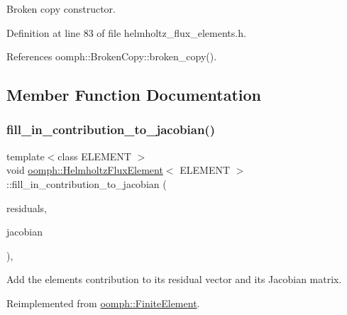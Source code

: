 Broken copy constructor. 



Definition at line 83 of file helmholtz\+\_\+flux\+\_\+elements.\+h.



References oomph\+::\+Broken\+Copy\+::broken\+\_\+copy().



\subsection{Member Function Documentation}
\mbox{\label{classoomph_1_1HelmholtzFluxElement_ac388e1c565715ffc9953fc548def1bf5}} 
\subsubsection{\texorpdfstring{fill\+\_\+in\+\_\+contribution\+\_\+to\+\_\+jacobian()}{fill\_in\_contribution\_to\_jacobian()}}
{\footnotesize\ttfamily template$<$class E\+L\+E\+M\+E\+NT $>$ \\
void \hyperlink{classoomph_1_1HelmholtzFluxElement}{oomph\+::\+Helmholtz\+Flux\+Element}$<$ E\+L\+E\+M\+E\+NT $>$\+::fill\+\_\+in\+\_\+contribution\+\_\+to\+\_\+jacobian (\begin{DoxyParamCaption}\item[{\hyperlink{classoomph_1_1Vector}{Vector}$<$ double $>$ \&}]{residuals,  }\item[{\hyperlink{classoomph_1_1DenseMatrix}{Dense\+Matrix}$<$ double $>$ \&}]{jacobian }\end{DoxyParamCaption})\hspace{0.3cm}{\ttfamily [inline]}, {\ttfamily [virtual]}}



Add the element\textquotesingle{}s contribution to its residual vector and its Jacobian matrix. 



Reimplemented from \hyperlink{classoomph_1_1FiniteElement_a0ae7af222af38a0d53bf283dc85bdfea}{oomph\+::\+Finite\+Element}.



